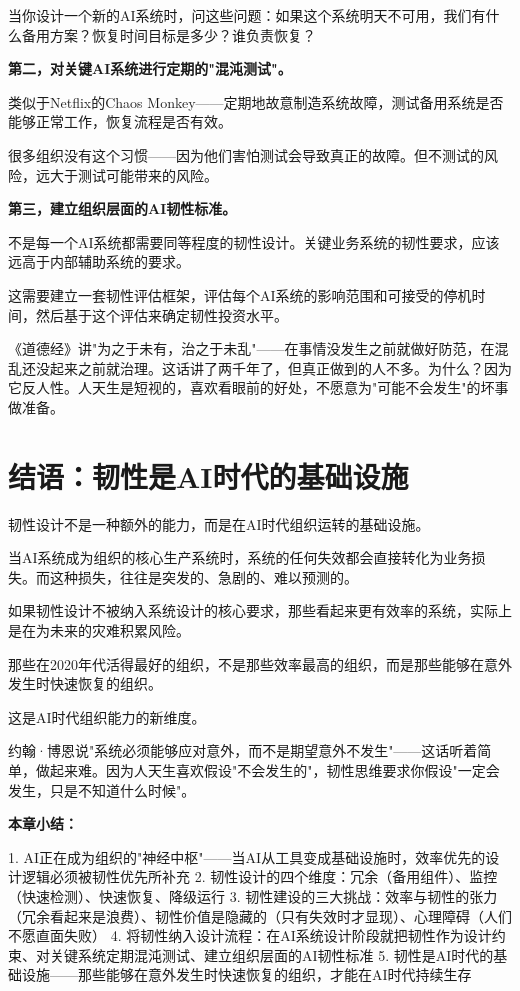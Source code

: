 当你设计一个新的AI系统时，问这些问题：如果这个系统明天不可用，我们有什么备用方案？恢复时间目标是多少？谁负责恢复？

\textbf{第二，对关键AI系统进行定期的"混沌测试"。}

类似于Netflix的Chaos Monkey——定期地故意制造系统故障，测试备用系统是否能够正常工作，恢复流程是否有效。

很多组织没有这个习惯——因为他们害怕测试会导致真正的故障。但不测试的风险，远大于测试可能带来的风险。

\textbf{第三，建立组织层面的AI韧性标准。}

不是每一个AI系统都需要同等程度的韧性设计。关键业务系统的韧性要求，应该远高于内部辅助系统的要求。

这需要建立一套韧性评估框架，评估每个AI系统的影响范围和可接受的停机时间，然后基于这个评估来确定韧性投资水平。

《道德经》讲"为之于未有，治之于未乱"——在事情没发生之前就做好防范，在混乱还没起来之前就治理。这话讲了两千年了，但真正做到的人不多。为什么？因为它反人性。人天生是短视的，喜欢看眼前的好处，不愿意为"可能不会发生"的坏事做准备。

\section{结语：韧性是AI时代的基础设施}


韧性设计不是一种额外的能力，而是在AI时代组织运转的基础设施。

当AI系统成为组织的核心生产系统时，系统的任何失效都会直接转化为业务损失。而这种损失，往往是突发的、急剧的、难以预测的。

如果韧性设计不被纳入系统设计的核心要求，那些看起来更有效率的系统，实际上是在为未来的灾难积累风险。

那些在2020年代活得最好的组织，不是那些效率最高的组织，而是那些能够在意外发生时快速恢复的组织。

这是AI时代组织能力的新维度。

约翰·博恩说"系统必须能够应对意外，而不是期望意外不发生"——这话听着简单，做起来难。因为人天生喜欢假设"不会发生的"，韧性思维要求你假设"一定会发生，只是不知道什么时候"。


\textbf{本章小结：}

1. AI正在成为组织的"神经中枢"——当AI从工具变成基础设施时，效率优先的设计逻辑必须被韧性优先所补充
2. 韧性设计的四个维度：冗余（备用组件）、监控（快速检测）、快速恢复、降级运行
3. 韧性建设的三大挑战：效率与韧性的张力（冗余看起来是浪费）、韧性价值是隐藏的（只有失效时才显现）、心理障碍（人们不愿直面失败）
4. 将韧性纳入设计流程：在AI系统设计阶段就把韧性作为设计约束、对关键系统定期混沌测试、建立组织层面的AI韧性标准
5. 韧性是AI时代的基础设施——那些能够在意外发生时快速恢复的组织，才能在AI时代持续生存
